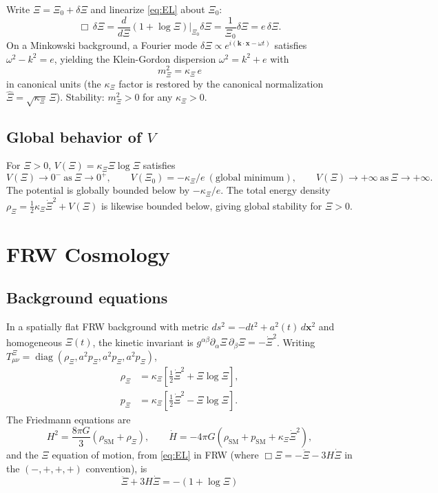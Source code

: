 \documentclass[11pt,reqno]{amsart}
\theoremstyle{plain}
\theoremstyle{definition}
\theoremstyle{remark}
\newcommand{\SM}{\mathrm{SM}}
\DeclareMathOperator{\diag}{diag}
\begin{document}
Write $\Xi=\Xi_0+\delta\Xi$ and linearize \eqref{eq:EL} about $\Xi_0$:
\[
  \Box\,\delta\Xi=\frac{d}{d\Xi}(1+\log\Xi)\bigg|_{\Xi_0}\delta\Xi=\frac{1}{\Xi_0}\delta\Xi=e\,\delta\Xi.
\]
On a Minkowski background, a Fourier mode $\delta\Xi\propto e^{i(\mathbf k\cdot\mathbf x-\omega t)}$
satisfies $\omega^{2}-k^{2}=e$, yielding the Klein-Gordon dispersion
$\omega^{2}=k^{2}+e$ with
\begin{equation}\label{eq:mass}
  \boxed{\;m_\Xi^{2}=\kappa_\Xi\,e\;}
\end{equation}
in canonical units (the $\kappa_\Xi$ factor is restored by the canonical
normalization $\hat\Xi=\sqrt{\kappa_\Xi}\,\Xi$). Stability:
$m_\Xi^{2}>0$ for any $\kappa_\Xi>0$.

\subsection{Global behavior of $V$}

For $\Xi>0$, $V(\Xi)=\kappa_\Xi\Xi\log\Xi$ satisfies
\[
  V(\Xi)\to 0^{-}\ \text{as}\ \Xi\to 0^{+},\qquad
  V(\Xi_0)=-\kappa_\Xi/e\ (\text{global minimum}),\qquad
  V(\Xi)\to+\infty\ \text{as}\ \Xi\to+\infty.
\]
The potential is globally bounded below by $-\kappa_\Xi/e$. The total energy
density $\rho_\Xi=\tfrac{1}{2}\kappa_\Xi\dot\Xi^{2}+V(\Xi)$ is likewise bounded
below, giving global stability for $\Xi>0$.

\section{FRW Cosmology}\label{sec:frw}

\subsection{Background equations}

In a spatially flat FRW background with metric
$ds^{2}=-dt^{2}+a^{2}(t)\,d\mathbf{x}^{2}$ and homogeneous $\Xi(t)$, the
kinetic invariant is $g^{\alpha\beta}\partial_\alpha\Xi\,\partial_\beta\Xi=-\dot\Xi^{2}$.
Writing $T^{\Xi}_{\mu\nu}=\diag(\rho_\Xi,a^{2}p_\Xi,a^{2}p_\Xi,a^{2}p_\Xi)$,
\begin{align}
  \rho_\Xi &= \kappa_\Xi\!\left[\tfrac{1}{2}\dot\Xi^{2}+\Xi\log\Xi\right],\label{eq:rho}\\
  p_\Xi &= \kappa_\Xi\!\left[\tfrac{1}{2}\dot\Xi^{2}-\Xi\log\Xi\right].\label{eq:p}
\end{align}
The Friedmann equations are
\begin{equation}\label{eq:friedmann}
  H^{2}=\frac{8\pi G}{3}\!\left(\rho_{\SM}+\rho_\Xi\right),\qquad
  \dot H=-4\pi G\!\left(\rho_{\SM}+p_{\SM}+\kappa_\Xi\dot\Xi^{2}\right),
\end{equation}
and the $\Xi$ equation of motion, from \eqref{eq:EL} in FRW (where
$\Box\Xi=-\ddot\Xi-3H\dot\Xi$ in the $(-,+,+,+)$ convention), is
\begin{equation}\label{eq:xieom}
  \boxed{\;\ddot\Xi+3H\dot\Xi=-(1+\log\Xi)\;}
\end{equation}
\end{document}
